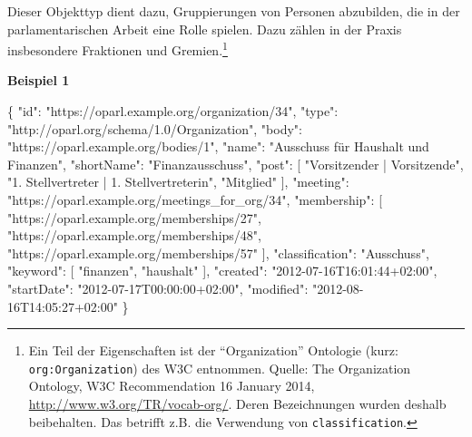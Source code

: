 \documentclass[,a4paper]{article}
\newenvironment{Shaded}{}{}
\newcommand{\DataTypeTok}[1]{\textcolor[rgb]{0.56,0.13,0.00}{{#1}}}
\newcommand{\StringTok}[1]{\textcolor[rgb]{0.25,0.44,0.63}{{#1}}}
\newcommand{\OtherTok}[1]{\textcolor[rgb]{0.00,0.44,0.13}{{#1}}}
\newcommand{\FunctionTok}[1]{\textcolor[rgb]{0.02,0.16,0.49}{{#1}}}
\begin{document}

Dieser Objekttyp dient dazu, Gruppierungen von Personen abzubilden, die
in der parlamentarischen Arbeit eine Rolle spielen. Dazu zählen in der
Praxis insbesondere Fraktionen und Gremien.\footnote{Ein Teil der
  Eigenschaften ist der ``Organization'' Ontologie (kurz:
  \texttt{org:Organization}) des W3C entnommen. Quelle: The Organization
  Ontology, W3C Recommendation 16 January 2014,
  \url{http://www.w3.org/TR/vocab-org/}. Deren Bezeichnungen wurden
  deshalb beibehalten. Das betrifft z.B. die Verwendung von
  \texttt{classification}.}

\textbf{Beispiel 1}

\begin{Shaded}
\begin{Highlighting}[]
\FunctionTok{\{}
    \DataTypeTok{"id"}\FunctionTok{:} \StringTok{"https://oparl.example.org/organization/34"}\FunctionTok{,}
    \DataTypeTok{"type"}\FunctionTok{:} \StringTok{"http://oparl.org/schema/1.0/Organization"}\FunctionTok{,}
    \DataTypeTok{"body"}\FunctionTok{:} \StringTok{"https://oparl.example.org/bodies/1"}\FunctionTok{,}
    \DataTypeTok{"name"}\FunctionTok{:} \StringTok{"Ausschuss für Haushalt und Finanzen"}\FunctionTok{,}
    \DataTypeTok{"shortName"}\FunctionTok{:} \StringTok{"Finanzausschuss"}\FunctionTok{,}
    \DataTypeTok{"post"}\FunctionTok{:} \OtherTok{[}
        \StringTok{"Vorsitzender | Vorsitzende"}\OtherTok{,}
        \StringTok{"1. Stellvertreter | 1. Stellvertreterin"}\OtherTok{,}
        \StringTok{"Mitglied"}
    \OtherTok{]}\FunctionTok{,}
    \DataTypeTok{"meeting"}\FunctionTok{:} \StringTok{"https://oparl.example.org/meetings_for_org/34"}\FunctionTok{,}
    \DataTypeTok{"membership"}\FunctionTok{:} \OtherTok{[}
        \StringTok{"https://oparl.example.org/memberships/27"}\OtherTok{,}
        \StringTok{"https://oparl.example.org/memberships/48"}\OtherTok{,}
        \StringTok{"https://oparl.example.org/memberships/57"}
    \OtherTok{]}\FunctionTok{,}
    \DataTypeTok{"classification"}\FunctionTok{:} \StringTok{"Ausschuss"}\FunctionTok{,}
    \DataTypeTok{"keyword"}\FunctionTok{:} \OtherTok{[}
        \StringTok{"finanzen"}\OtherTok{,}
        \StringTok{"haushalt"}
    \OtherTok{]}\FunctionTok{,}
    \DataTypeTok{"created"}\FunctionTok{:} \StringTok{"2012-07-16T16:01:44+02:00"}\FunctionTok{,}
    \DataTypeTok{"startDate"}\FunctionTok{:} \StringTok{"2012-07-17T00:00:00+02:00"}\FunctionTok{,}
    \DataTypeTok{"modified"}\FunctionTok{:} \StringTok{"2012-08-16T14:05:27+02:00"}
\FunctionTok{\}}
\end{Highlighting}
\end{Shaded}
\end{document}
